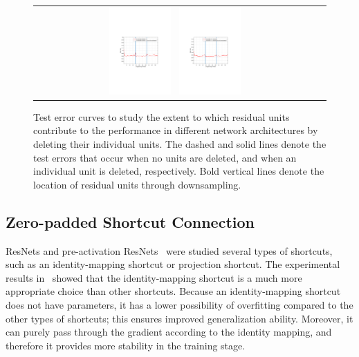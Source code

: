 \documentclass[10pt,twocolumn,letterpaper]{article}
\begin{document}
\begin{figure}[t]
\begin{center}
\begin{tabular}{cc}
\includegraphics[trim = 37mm 94mm 44mm 100mm, clip,  width=0.225\textwidth, height=0.18\textwidth]{Images2/Line_1.pdf} \
\includegraphics[trim = 37mm 94mm 44mm 100mm, clip,  width=0.225\textwidth, height=0.18\textwidth]{Images2/Line_2.pdf}
\end{tabular}
\end{center}
\caption{Test error curves to study the extent to which residual units contribute to the performance in different network architectures by deleting their individual units. The dashed and solid lines denote the test errors that occur when no units are deleted, and when an individual unit is deleted, respectively. Bold vertical lines denote the location of residual units through downsampling.}
\label{fig:lines}
\end{figure}

\subsection{Zero-padded Shortcut Connection}
ResNets and pre-activation ResNets~\cite{resnet, preresnet} were studied several types of shortcuts, such as an identity-mapping shortcut or projection shortcut. The experimental results in~\cite{preresnet} showed that the identity-mapping shortcut is a much more appropriate choice than other shortcuts. Because an identity-mapping shortcut does not have parameters, it has a lower possibility of overfitting compared to the other types of shortcuts; this ensures improved generalization ability. Moreover, it can purely pass through the gradient according to the identity mapping, and therefore it provides more stability in the training stage.
\end{document}
